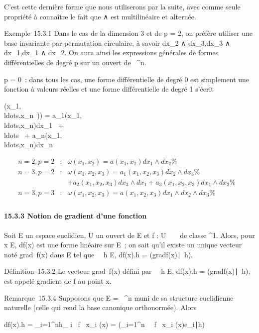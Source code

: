 \documentclass[]{article}
\begin{document}
C'est cette dernière forme que nous utiliserons par la suite, avec comme
seule propriété à connaître le fait que ∧ est multilinéaire et alternée.

Exemple~15.3.1 Dans le cas de la dimension 3 et de p = 2, on préfère
utiliser une base invariante par permutation circulaire, à savoir
dx_2 ∧ dx_3,dx_3 ∧
dx_1,dx_1 ∧ dx_2. On aura ainsi les
expressions générales de formes différentielles de degré p sur un ouvert
de ~^n.

p = 0~: dans tous les cas, une forme différentielle de degré 0 est
simplement une fonction à valeurs réelles et une forme différentielle de
degré 1 s'écrit

\omega(x_1,\\ldots,x_n~))
=
a_1(x_1,\\ldots,x_n)dx_1~
+ \\ldots~ +
a_n(x_1,\\ldots,x_n)dx_n~

\begin{align*} n = 2,p = 2& :&
\omega(x_1,x_2) = a(x_1,x_2)dx_1
∧ dx_2 \%& \\ n = 3,p = 2& :&
\omega(x_1,x_2,x_3) =
a_1(x_1,x_2,x_3)dx_2 ∧
dx_3 \%& \\ & &
+a_2(x_1,x_2,x_3)dx_3 ∧
dx_1 +
a_3(x_1,x_2,x_3)dx_1 ∧
dx_2\%& \\ n = 3,p = 3& :&
\omega(x_1,x_2,x_3) =
a(x_1,x_2,x_3)dx_1 ∧ dx_2 ∧
dx_3 \%& \\
\end{align*}

\paragraph{15.3.3 Notion de gradient d'une fonction}

Soit E un espace euclidien, U un ouvert de E et f : U \rightarrow~ ~ de classe
^1. Alors, pour x \in E, df(x) est une forme linéaire sur E~;
on sait qu'il existe un unique vecteur noté
grad~f(x) dans E tel que
\forall~~h \in E, df(x).h =
(gradf(x)\mathrel∣~h).

Définition~15.3.2 Le vecteur grad~f(x) défini
par \forall~~h \in E, df(x).h =
(gradf(x)\mathrel∣~h), est
appelé gradient de f au point x.

Remarque~15.3.4 Supposons que E = ~^n muni de sa structure
euclidienne naturelle (celle qui rend la base canonique orthonormée).
Alors

df(x).h = \sum _i=1^nh_
i \partial~f \over \partial~x_i (x) =
(\sum _i=1^n~ \partial~f
\over \partial~x_i
(x)e_i∣h)
\end{document}
